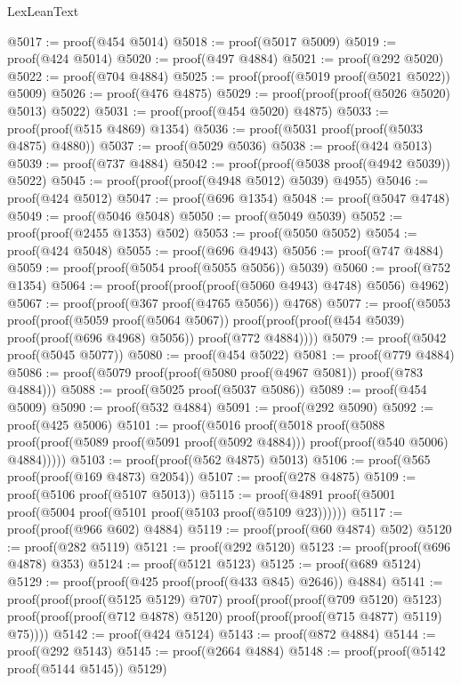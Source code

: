 \begin{lexlean}{LexLeanText}
\begin{coremodule}
@5017 := proof(@454 @5014)
@5018 := proof(@5017 @5009)
@5019 := proof(@424 @5014)
@5020 := proof(@497 @4884)
@5021 := proof(@292 @5020)
@5022 := proof(@704 @4884)
@5025 := proof(proof(@5019 proof(@5021 @5022)) @5009)
@5026 := proof(@476 @4875)
@5029 := proof(proof(proof(@5026 @5020) @5013) @5022)
@5031 := proof(proof(@454 @5020) @4875)
@5033 := proof(proof(@515 @4869) @1354)
@5036 := proof(@5031 proof(proof(@5033 @4875) @4880))
@5037 := proof(@5029 @5036)
@5038 := proof(@424 @5013)
@5039 := proof(@737 @4884)
@5042 := proof(proof(@5038 proof(@4942 @5039)) @5022)
@5045 := proof(proof(proof(@4948 @5012) @5039) @4955)
@5046 := proof(@424 @5012)
@5047 := proof(@696 @1354)
@5048 := proof(@5047 @4748)
@5049 := proof(@5046 @5048)
@5050 := proof(@5049 @5039)
@5052 := proof(proof(@2455 @1353) @502)
@5053 := proof(@5050 @5052)
@5054 := proof(@424 @5048)
@5055 := proof(@696 @4943)
@5056 := proof(@747 @4884)
@5059 := proof(proof(@5054 proof(@5055 @5056)) @5039)
@5060 := proof(@752 @1354)
@5064 := proof(proof(proof(proof(@5060 @4943) @4748) @5056) @4962)
@5067 := proof(proof(@367 proof(@4765 @5056)) @4768)
@5077 := proof(@5053
      proof(proof(@5059 proof(@5064 @5067))
          proof(proof(proof(@454 @5039) proof(proof(@696 @4968) @5056)) proof(@772 @4884))))
@5079 := proof(@5042 proof(@5045 @5077))
@5080 := proof(@454 @5022)
@5081 := proof(@779 @4884)
@5086 := proof(@5079 proof(proof(@5080 proof(@4967 @5081)) proof(@783 @4884)))
@5088 := proof(@5025 proof(@5037 @5086))
@5089 := proof(@454 @5009)
@5090 := proof(@532 @4884)
@5091 := proof(@292 @5090)
@5092 := proof(@425 @5006)
@5101 := proof(@5016
      proof(@5018
          proof(@5088
              proof(proof(@5089 proof(@5091 proof(@5092 @4884))) proof(proof(@540 @5006) @4884)))))
@5103 := proof(proof(@562 @4875) @5013)
@5106 := proof(@565 proof(proof(@169 @4873) @2054))
@5107 := proof(@278 @4875)
@5109 := proof(@5106 proof(@5107 @5013))
@5115 := proof(@4891 proof(@5001 proof(@5004 proof(@5101 proof(@5103 proof(@5109 @23))))))
@5117 := proof(proof(@966 @602) @4884)
@5119 := proof(proof(@60 @4874) @502)
@5120 := proof(@282 @5119)
@5121 := proof(@292 @5120)
@5123 := proof(proof(@696 @4878) @353)
@5124 := proof(@5121 @5123)
@5125 := proof(@689 @5124)
@5129 := proof(proof(@425 proof(proof(@433 @845) @2646)) @4884)
@5141 := proof(proof(proof(@5125 @5129) @707)
      proof(proof(proof(@709 @5120) @5123)
          proof(proof(proof(@712 @4878) @5120) proof(proof(proof(@715 @4877) @5119) @75))))
@5142 := proof(@424 @5124)
@5143 := proof(@872 @4884)
@5144 := proof(@292 @5143)
@5145 := proof(@2664 @4884)
@5148 := proof(proof(@5142 proof(@5144 @5145)) @5129)

\end{coremodule}
\end{lexlean}
